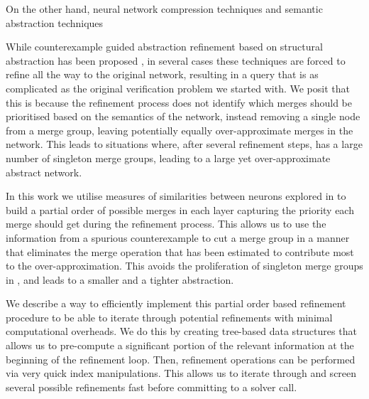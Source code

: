 On the other hand, neural network compression techniques  and
semantic abstraction techniques \cite{deep-abstract, lin-comb-abs-jan}

While counterexample guided abstraction refinement based on structural
abstraction has been proposed \cite{cegar-nn} , in
several cases these techniques are forced to refine all the way to the original
network, resulting in a query that is as complicated as the original
verification problem we started with. We posit that this is because the
refinement process does not
identify which merges should be prioritised based on the semantics of the
network, instead removing a single node from a merge group, leaving potentially
equally over-approximate merges in the network. This leads to situations where,
after several refinement steps, \abs has a large number of singleton merge
groups, leading to a large yet over-approximate abstract network. 

In this work we utilise measures of similarities between neurons explored in
 to build a partial
order of possible merges in each layer capturing the priority each merge should
get during the refinement process. This allows us to use the information from a
spurious counterexample to cut a merge group in a manner that eliminates the
merge operation that has been estimated to contribute most to the
over-approximation. This avoids the proliferation of singleton merge groups in
\abs, and leads to a smaller and a tighter abstraction.

We describe a way to efficiently implement this partial order based refinement
procedure to be able to iterate through potential refinements with minimal
computational overheads. We do this by creating tree-based data structures that
allows us to pre-compute a significant portion of the relevant information at
the beginning of the refinement loop. Then, refinement operations can be
performed via very quick index manipulations. This allows us to iterate through
and screen several possible refinements fast before committing to a solver call.
